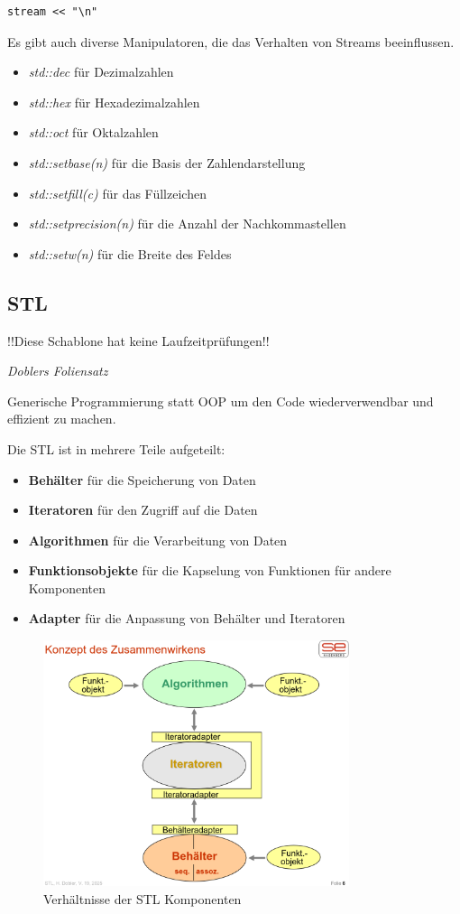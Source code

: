 \documentclass[12pt]{scrartcl}
\begin{document}
\begin{verbatim}
stream << "\n"
\end{verbatim}

Es gibt auch diverse Manipulatoren, die das Verhalten von Streams beeinflussen.
\begin{itemize}
	\item \emph{std::dec} für Dezimalzahlen
	\item \emph{std::hex} für Hexadezimalzahlen
	\item \emph{std::oct} für Oktalzahlen
	\item \emph{std::setbase(n)} für die Basis der Zahlendarstellung
	\item \emph{std::setfill(c)} für das Füllzeichen
	\item \emph{std::setprecision(n)} für die Anzahl der Nachkommastellen
	\item \emph{std::setw(n)} für die Breite des Feldes
\end{itemize}
\pagebreak

\subsection{STL}
\epigraph{!!Diese Schablone hat keine Laufzeitprüfungen!!}{\textit{Doblers Foliensatz}}

Generische Programmierung statt OOP um den Code wiederverwendbar und effizient zu machen.

Die STL ist in mehrere Teile aufgeteilt:
\begin{itemize}
	\item \textbf{Behälter} für die Speicherung von Daten
	\item \textbf{Iteratoren} für den Zugriff auf die Daten
	\item \textbf{Algorithmen} für die Verarbeitung von Daten
	\item \textbf{Funktionsobjekte} für die Kapselung von Funktionen für andere Komponenten
	\item \textbf{Adapter} für die Anpassung von Behälter und Iteratoren
\end{itemize}

\begin{figure}[H]
	\centering
	\includegraphics[width=0.8\textwidth]{images/stl_1.png}
	\caption{Verhältnisse der STL Komponenten}
\end{figure}
\end{document}
